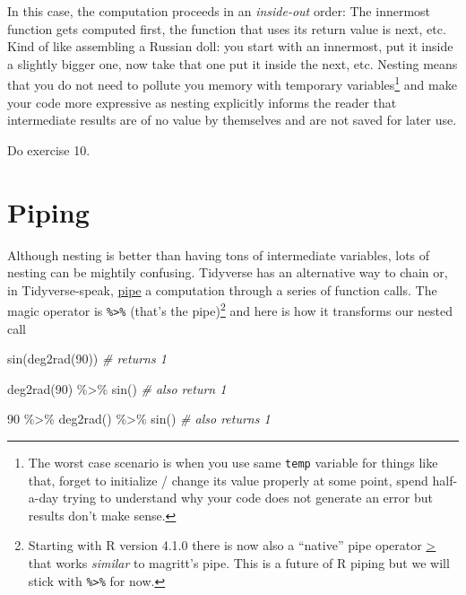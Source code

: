 \documentclass[
]{book}
\newenvironment{Shaded}{\begin{snugshade}}{\end{snugshade}}
\newcommand{\CommentTok}[1]{\textcolor[rgb]{0.56,0.35,0.01}{\textit{#1}}}
\newcommand{\DecValTok}[1]{\textcolor[rgb]{0.00,0.00,0.81}{#1}}
\newcommand{\FunctionTok}[1]{\textcolor[rgb]{0.00,0.00,0.00}{#1}}
\newcommand{\NormalTok}[1]{#1}
\newcommand{\SpecialCharTok}[1]{\textcolor[rgb]{0.00,0.00,0.00}{#1}}
\begin{document}
In this case, the computation proceeds in an \emph{inside-out} order: The innermost function gets computed first, the function that uses its return value is next, etc. Kind of like assembling a Russian doll: you start with an innermost, put it inside a slightly bigger one, now take that one put it inside the next, etc. Nesting means that you do not need to pollute you memory with temporary variables\footnote{The worst case scenario is when you use same \texttt{temp} variable for things like that, forget to initialize / change its value properly at some point, spend half-a-day trying to understand why your code does not generate an error but results don't make sense.} and make your code more expressive as nesting explicitly informs the reader that intermediate results are of no value by themselves and are not saved for later use.

Do exercise 10.

\hypertarget{pipe}{%
\section{Piping}\label{pipe}}

Although nesting is better than having tons of intermediate variables, lots of nesting can be mightily confusing. Tidyverse has an alternative way to chain or, in Tidyverse-speak, \href{https://magrittr.tidyverse.org/reference/pipe.html}{pipe} a computation through a series of function calls. The magic operator is \texttt{\%\textgreater{}\%} (that's the pipe)\footnote{Starting with R version 4.1.0 there is now also a ``native'' pipe operator \href{https://stat.ethz.ch/R-manual/R-devel/library/base/html/pipeOp.html}{\textbar\textgreater{}} that works \emph{similar} to magritt's pipe. This is a future of R piping but we will stick with \texttt{\%\textgreater{}\%} for now.} and here is how it transforms our nested call

\begin{Shaded}
\begin{Highlighting}[]
\FunctionTok{sin}\NormalTok{(}\FunctionTok{deg2rad}\NormalTok{(}\DecValTok{90}\NormalTok{)) }\CommentTok{\# returns 1}

\FunctionTok{deg2rad}\NormalTok{(}\DecValTok{90}\NormalTok{) }\SpecialCharTok{\%\textgreater{}\%} \FunctionTok{sin}\NormalTok{() }\CommentTok{\# also return 1}

\DecValTok{90} \SpecialCharTok{\%\textgreater{}\%} \FunctionTok{deg2rad}\NormalTok{() }\SpecialCharTok{\%\textgreater{}\%} \FunctionTok{sin}\NormalTok{() }\CommentTok{\# also returns 1}
\end{Highlighting}
\end{Shaded}
\end{document}
